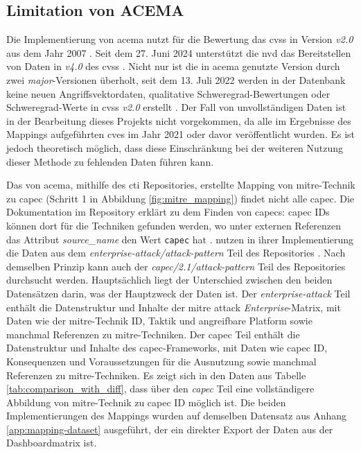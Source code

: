 \subsection{Limitation von ACEMA}
\label{limitationen-acema}
Die Implementierung von \gls{acema} nutzt für die Bewertung das \gls{cvss} in Version \textit{v2.0} aus dem Jahr 2007 \autocite{Acema_oranOCloud_Data_GatheringpyMaster}. Seit dem 27. Juni 2024 unterstützt die \gls{nvd} das Bereitstellen von Daten in \textit{v4.0} des \gls{cvss} \autocite{NVDCVSSV40}. Nicht nur ist die in \gls{acema} genutzte Version durch zwei \textit{major}-Versionen überholt, seit dem 13. Juli 2022 werden in der Datenbank keine neuen Angriffsvektordaten, qualitative Schweregrad-Bewertungen oder Schweregrad-Werte in \gls{cvss} \textit{v2.0} erstellt \autocite{RetirementCVSSV2}. Der Fall von unvollständigen Daten ist in der Bearbeitung dieses Projekts nicht vorgekommen, da alle im Ergebnisse des Mappings aufgeführten \glspl{cve} im Jahr 2021 oder davor veröffentlicht wurden. Es ist jedoch theoretisch möglich, dass diese Einschränkung bei der weiteren Nutzung dieser Methode zu fehlenden Daten führen kann.
%
\par Das von \gls{acema}, mithilfe des \gls{cti} Repositories, erstellte Mapping von \gls{mitre}-Technik zu \gls{capec} (Schritt 1 in Abbildung \ref{fig:mitre_mapping}) findet nicht alle \gls{capec}. Die Dokumentation im Repository erklärt zu dem Finden von \glspl{capec}: \gls{capec} IDs können dort für die Techniken gefunden werden, wo unter externen Referenzen das Attribut \textit{source\_name} den Wert \verb|capec| hat \autocite{CtiUSAGEmdMaster} \autocite{CtiUSAGECAPECmdMaster}. \citeauthor{klementSecuring6GTransition2024} nutzen in ihrer Implementierung die Daten aus dem \textit{enterprise-attack/attack-pattern} Teil des Repositories \autocite{klement2023acema}. Nach demselben Prinzip kann auch der \textit{capec/2.1/attack-pattern} Teil des Repositories durchsucht werden. Hauptsächlich liegt der Unterschied zwischen den beiden Datensätzen darin, was der Hauptzweck der Daten ist. Der \textit{enterprise-attack} Teil enthält die Datenstruktur und Inhalte der \gls{mitre} \gls{attack} \textit{Enterprise}-Matrix, mit Daten wie der \gls{mitre}-Technik ID, Taktik und angreifbare Platform sowie manchmal Referenzen zu \gls{mitre}-Techniken. Der \gls{capec} Teil enthält die Datenstruktur und Inhalte des \gls{capec}-Frameworks, mit Daten wie \gls{capec} ID, Konsequenzen und Voraussetzungen für die Ausnutzung sowie manchmal Referenzen zu \gls{mitre}-Techniken. Es zeigt sich in den Daten aus Tabelle \ref{tab:comparison_with_diff}, dass über den \textit{\gls{capec}} Teil eine vollständigere Abbildung von \gls{mitre}-Technik zu \gls{capec} ID möglich ist. Die beiden Implementierungen des Mappings wurden auf demselben Datensatz aus Anhang \ref{app:mapping-dataset} ausgeführt, der ein direkter Export der Daten aus der Dashboardmatrix ist.
%

